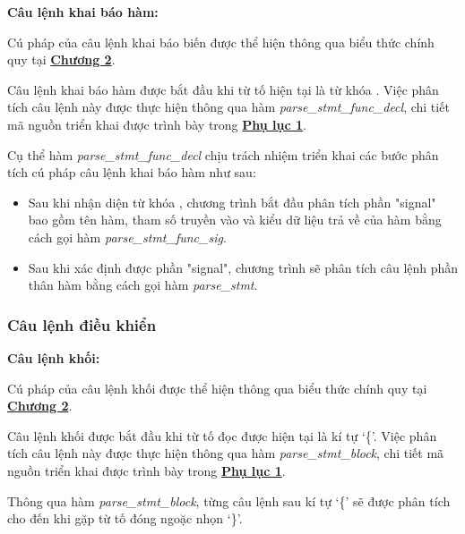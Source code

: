 \textbf{Câu lệnh khai báo hàm:}

Cú pháp của câu lệnh khai báo biến được thể hiện thông qua biểu thức chính quy tại \hyperref[ch2:decl_var_stmt]{\bf Chương 2}.

Câu lệnh khai báo hàm được bắt đầu khi từ tố hiện tại là từ khóa . Việc phân tích câu lệnh này được thực hiện thông qua hàm \textit{parse\_stmt\_func\_decl}, chi tiết mã nguồn triển khai được trình bày trong \hyperref[ap1:stmtdeclfun]{\bf Phụ lục 1}. %

Cụ thể hàm \textit{parse\_stmt\_func\_decl} chịu trách nhiệm triển khai các bước phân tích cú pháp câu lệnh khai báo hàm như sau:

\begin{itemize}
    \item Sau khi nhận diện từ khóa , chương trình bắt đầu phân tích phần "signal" bao gồm tên hàm, tham số truyền vào và kiểu dữ liệu trả về của hàm bằng cách gọi hàm \textit{parse\_stmt\_func\_sig}.
    \item Sau khi xác định được phần "signal", chương trình sẽ phân tích câu lệnh phần thân hàm bằng cách gọi hàm \textit{parse\_stmt}.
\end{itemize}

\subsubsection{Câu lệnh điều khiển}

\textbf{Câu lệnh khối:}

Cú pháp của câu lệnh khối được thể hiện thông qua biểu thức chính quy tại \hyperref[ch2:block_stmt]{\bf Chương 2}.

Câu lệnh khối được bắt đầu khi từ tố đọc được hiện tại là kí tự `\{'. Việc phân tích câu lệnh này được thực hiện thông qua hàm \textit{parse\_stmt\_block}, chi tiết mã nguồn triển khai được trình bày trong \hyperref[ap1:stmtblock]{\bf Phụ lục 1}. %

        
Thông qua hàm \textit{parse\_stmt\_block}, từng câu lệnh sau kí tự `\{' sẽ được phân tích cho đến khi gặp từ tố đóng ngoặc nhọn `\}'.

